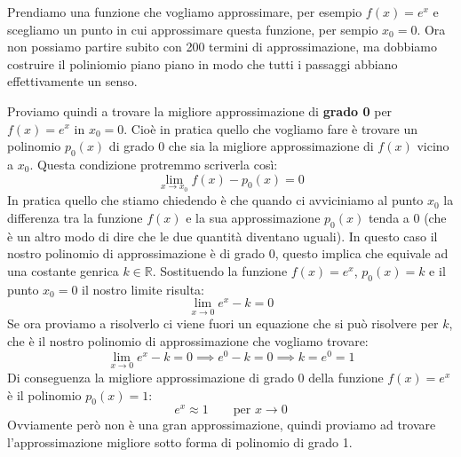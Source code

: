 Prendiamo una funzione che vogliamo approssimare, per esempio $f(x) = e^x$ e scegliamo un punto in cui approssimare questa funzione, per sempio $x_0 = 0$. Ora non possiamo partire subito con 200 termini di approssimazione, ma dobbiamo costruire il poliniomio piano piano in modo che tutti i passaggi abbiano effettivamente un senso. 

Proviamo quindi a trovare la migliore approssimazione di \textbf{grado 0} per $f(x) = e^x$ in $x_0 = 0$. Cioè in pratica quello che vogliamo fare è trovare un polinomio $p_0(x)$ di grado $0$ che sia la migliore approssimazione di $f(x)$ vicino a $x_0$. Questa condizione protremmo scriverla così:
\begin{equation*}
	\lim_{x \to x_0} f(x) - p_0(x) = 0
\end{equation*}
In pratica quello che stiamo chiedendo è che quando ci avviciniamo al punto $x_0$ la differenza tra la funzione $f(x)$ e la sua approssimazione $p_0(x)$ tenda a 0 (che è un altro modo di dire che le due quantità diventano uguali). In questo caso il nostro polinomio di approssimazione è di grado 0, questo implica che equivale ad una costante genrica $k \in \mathbb{R}$. Sostituendo la funzione $f(x) = e^x$, $p_0(x) = k$ e il punto $x_0 = 0$ il nostro limite risulta:
\begin{equation*}
	\lim_{x \to 0} e^x - k  = 0
\end{equation*}
Se ora proviamo a risolverlo ci viene fuori un equazione che si può risolvere per $k$, che è il nostro polinomio di approssimazione che vogliamo trovare:
\begin{equation*}
	\lim_{x \to 0} e^x - k  = 0 \implies e^0 - k  = 0 \implies k = e^0 = 1
\end{equation*}
Di conseguenza la migliore approssimazione di grado 0 della funzione $f(x) = e^x$ è il polinomio $p_0(x) = 1$:
\begin{equation*}
	e^x \approx 1 \qquad \text{per } x \to 0
\end{equation*}
Ovviamente però non è una gran approssimazione, quindi proviamo ad trovare l'approssimazione migliore sotto forma di polinomio di grado 1.\\

